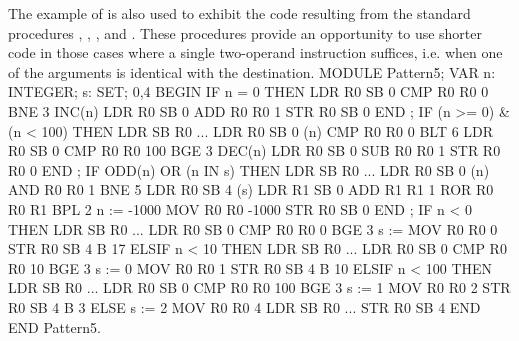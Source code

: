 The example of  is also used to exhibit the code resulting from the standard procedures , , , and . These procedures provide an opportunity to use shorter code in those cases where a single two-operand instruction suffices, i.e. when one of the arguments is identical with the destination.
\eject %
\begintt
MODULE Pattern5;
  VAR n: INTEGER; s: SET;            0,4
BEGIN
  IF n = 0 THEN                      LDR R0 SB 0
                                     CMP R0 R0 0
                                     BNE 3
    INC(n)                           LDR R0 SB 0
                                     ADD R0 R0 1
                                     STR R0 SB 0
  END ;                              
  IF (n >= 0) & (n < 100) THEN       LDR SB R0 ...
                                     LDR R0 SB 0 (n)
                                     CMP R0 R0 0
                                     BLT 6
                                     LDR R0 SB 0
                                     CMP R0 R0 100
                                     BGE 3
    DEC(n)                           LDR R0 SB 0
                                     SUB R0 R0 1
                                     STR R0 R0 0
  END ;                              
  IF ODD(n) OR (n IN s) THEN         LDR SB R0 ...
                                     LDR R0 SB 0 (n)
                                     AND R0 R0 1
                                     BNE 5
                                     LDR R0 SB 4 (s)
                                     LDR R1 SB 0
                                     ADD R1 R1 1
                                     ROR R0 R0 R1
                                     BPL 2
    n := -1000                       MOV R0 R0 -1000
                                     STR R0 SB 0
  END ;                                   
  IF n < 0 THEN                      LDR SB R0 ...
                                     LDR R0 SB 0
                                     CMP R0 R0 0
                                     BGE 3
    s := {}                          MOV R0 R0 0 {}
                                     STR R0 SB 4
                                     B 17
  ELSIF n < 10 THEN                  LDR SB R0 ...
                                     LDR R0 SB 0
                                     CMP R0 R0 10
                                     BGE 3
    s := {0}                         MOV R0 R0 1
                                     STR R0 SB 4
                                     B 10
  ELSIF n < 100 THEN                 LDR SB R0 ...
                                     LDR R0 SB 0
                                     CMP R0 R0 100
                                     BGE 3
    s := {1}                         MOV R0 R0 2
                                     STR R0 SB 4
                                     B 3
  ELSE                               
    s := {2}                         MOV R0 R0 4
                                     LDR SB R0 ...
                                     STR R0 SB 4
  END
END Pattern5.
\endtt


